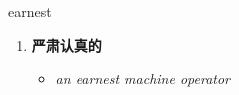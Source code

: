 
\begin{frame}
{\huge earnest}
\begin{center}
\begin{enumerate}\Large
  \item \textbf{严肃认真的}
  \begin{itemize}
    \item \em{\Large{an earnest machine operator}}
  \end{itemize}
\end{enumerate}
\end{center}
\end{frame}
